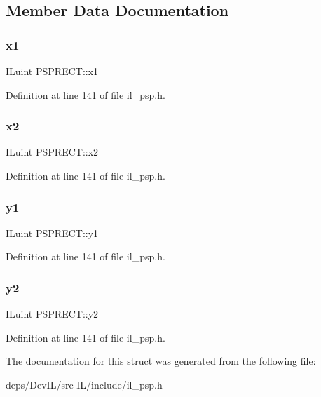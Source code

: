 \subsection{Member Data Documentation}
\mbox{\label{structPSPRECT_a04968f2d66495ba0e51065b2127d6df6}} 
\subsubsection{\texorpdfstring{x1}{x1}}
{\footnotesize\ttfamily I\+Luint P\+S\+P\+R\+E\+C\+T\+::x1}



Definition at line 141 of file il\+\_\+psp.\+h.

\mbox{\label{structPSPRECT_ac373f1f49278d05b31274c7a08956de3}} 
\subsubsection{\texorpdfstring{x2}{x2}}
{\footnotesize\ttfamily I\+Luint P\+S\+P\+R\+E\+C\+T\+::x2}



Definition at line 141 of file il\+\_\+psp.\+h.

\mbox{\label{structPSPRECT_af86921b1c28de8131cdef63053ff9250}} 
\subsubsection{\texorpdfstring{y1}{y1}}
{\footnotesize\ttfamily I\+Luint P\+S\+P\+R\+E\+C\+T\+::y1}



Definition at line 141 of file il\+\_\+psp.\+h.

\mbox{\label{structPSPRECT_a0739700cc9ada1bfc1966e12b42b4422}} 
\subsubsection{\texorpdfstring{y2}{y2}}
{\footnotesize\ttfamily I\+Luint P\+S\+P\+R\+E\+C\+T\+::y2}



Definition at line 141 of file il\+\_\+psp.\+h.



The documentation for this struct was generated from the following file\+:\begin{DoxyCompactItemize}
\item 
deps/\+Dev\+I\+L/src-\/\+I\+L/include/il\+\_\+psp.\+h\end{DoxyCompactItemize}
